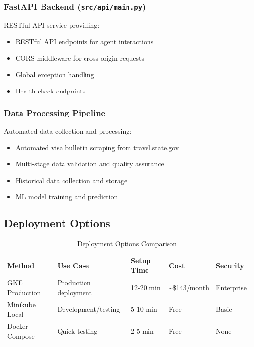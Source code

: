 \documentclass[11pt,a4paper]{article}
\newcommand{\code}[1]{\texttt{#1}}
\begin{document}
\subsubsection{FastAPI Backend (\code{src/api/main.py})}
RESTful API service providing:
\begin{itemize}[itemsep=0.2em]
    \item RESTful API endpoints for agent interactions
    \item CORS middleware for cross-origin requests
    \item Global exception handling
    \item Health check endpoints
\end{itemize}

\subsubsection{Data Processing Pipeline}
Automated data collection and processing:
\begin{itemize}[itemsep=0.2em]
    \item Automated visa bulletin scraping from travel.state.gov
    \item Multi-stage data validation and quality assurance
    \item Historical data collection and storage
    \item ML model training and prediction
\end{itemize}

\subsection{Deployment Options}

\begin{table}[h!]
\centering
\begin{tabular}{@{}lllll@{}}
\toprule
\textbf{Method} & \textbf{Use Case} & \textbf{Setup Time} & \textbf{Cost} & \textbf{Security} \\
\midrule
GKE Production & Production deployment & 12-20 min & \textasciitilde\$143/month & Enterprise \\
Minikube Local & Development/testing & 5-10 min & Free & Basic \\
Docker Compose & Quick testing & 2-5 min & Free & None \\
\bottomrule
\end{tabular}
\caption{Deployment Options Comparison}
\end{table}
\end{document}
